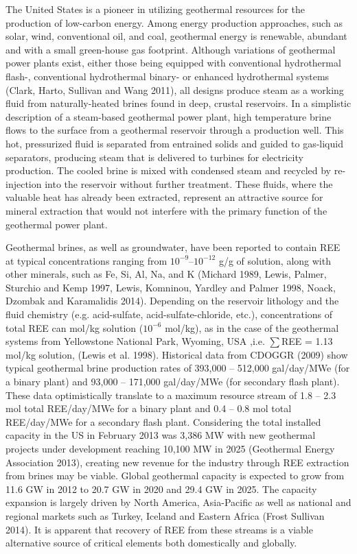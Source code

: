 The United States is a pioneer in utilizing geothermal resources for the production of low-carbon energy.
Among energy production approaches, such as solar, wind, conventional oil, and coal, geothermal energy is renewable, abundant and with a small green-house gas footprint.
Although variations of geothermal power plants exist, either those being equipped with conventional hydrothermal flash-, conventional hydrothermal binary- or enhanced hydrothermal systems (Clark, Harto, Sullivan and Wang 2011),
all designs produce steam as a working fluid from naturally-heated brines found in deep, crustal reservoirs.
In a simplistic description of a steam-based geothermal power plant, high temperature brine flows to the surface from a geothermal reservoir through a production well.
This hot, pressurized fluid is separated from entrained solids and guided to gas-liquid separators, producing steam that is delivered to turbines for electricity production.
The cooled brine is mixed with condensed steam and recycled by re-injection into the reservoir without further treatment.
These fluids, where the valuable heat has already been extracted, represent an attractive source for mineral extraction that would not interfere with the primary function of the geothermal power plant.

Geothermal brines, as well as groundwater, have been reported to contain REE at typical concentrations ranging from $10^{-9}$--$10^{-12}$ g/g of solution, along with other minerals, such as Fe, Si, Al, Na, and K (Michard 1989, Lewis, Palmer, Sturchio and Kemp 1997, Lewis, Komninou, Yardley and Palmer 1998, Noack, Dzombak and Karamalidis 2014).
Depending on the reservoir lithology and the fluid chemistry (e.g. acid-sulfate, acid-sulfate-chloride, etc.), concentrations of total REE can \si{\micro}mol/kg solution ($10^{-6}$ mol/kg), as in the case of the geothermal systems from Yellowstone National Park, Wyoming, USA ,i.e. $\sum$REE = 1.13 \si{\micro}mol/kg solution, (Lewis et al. 1998).
Historical data from CDOGGR (2009) show typical geothermal brine production rates of 393,000 -- 512,000 gal/day/MWe (for a binary plant) and 93,000 -- 171,000 gal/day/MWe (for secondary flash plant).
These data optimistically translate to a maximum resource stream of 1.8 -- 2.3 mol total REE/day/MWe for a binary plant and 0.4 -- 0.8 mol total REE/day/MWe for a secondary flash plant.
Considering the total installed capacity in the US in February 2013 was 3,386 MW with new geothermal projects under development reaching 10,100 MW in 2025 (Geothermal Energy Association 2013),
creating new revenue for the industry through REE extraction from brines may be viable.
Global geothermal capacity is expected to grow from 11.6 GW in 2012 to 20.7 GW in 2020 and 29.4 GW in 2025.
The capacity expansion is largely driven by North America, Asia-Pacific as well as national and regional markets such as Turkey, Iceland and Eastern Africa (Frost  Sullivan 2014).
It is apparent that recovery of REE from these streams is a viable alternative source of critical elements both domestically and globally.

